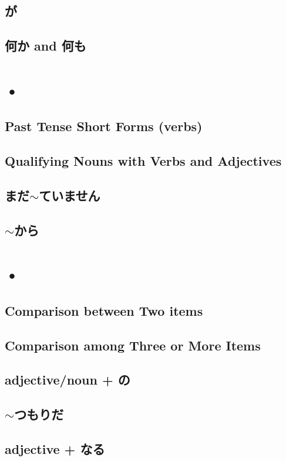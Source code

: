 \documentclass{article}
\begin{document}
   \subsection{が}
   \subsection{何か and 何も}
   
   \newpage
   
   \section{•}
   \subsection{Past Tense Short Forms (verbs)}
   \subsection{Qualifying Nouns with Verbs and Adjectives}
   \subsection{まだ$\sim$ていません}
   \subsection{$\sim$から}
   
   \newpage
   
   \section{•}
   \subsection{Comparison between Two items}
   \subsection{Comparison among Three or More Items}
   \subsection{adjective/noun + の}
   \subsection{$\sim$つもりだ}
   \subsection{adjective + なる}
\end{document}
